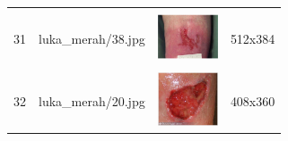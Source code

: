 \begin{table}[H]
\begin{tabular}{|m{0.2in}|m{1.2in}|m{0.7in}|m{0.7in}|}
		& &  &  \\
		31& 
		luka\_merah/38.jpg &
		\includegraphics[width=0.7in]{gambar/dataset_citra/luka_merah/38.jpg}&
		512x384\\
		\hline
		
		& &  &  \\
		32& 
		luka\_merah/20.jpg &
		\includegraphics[width=0.7in]{gambar/dataset_citra/luka_merah/20.jpg}&
		408x360\\
		\hline
	\end{tabular}
\end{table}

